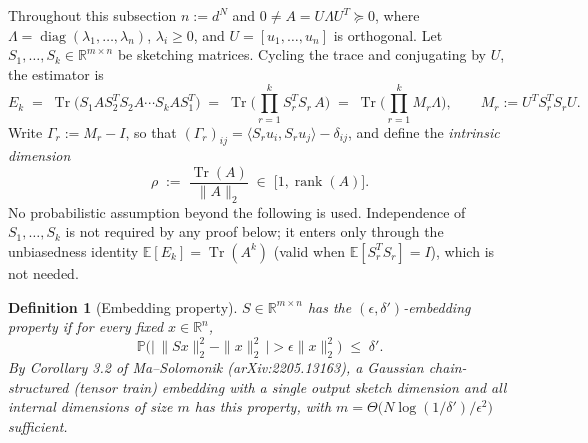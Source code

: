 \documentclass{article}
\newtheorem{definition}[theorem]{Definition}
\theoremstyle{remark}
\begin{document}
Throughout this subsection $n := d^N$ and $0 \neq A = U \Lambda U^T \succeq 0$, where $\Lambda = \operatorname{diag}(\lambda_1,\dots,\lambda_n)$, $\lambda_i \ge 0$, and $U = [u_1,\dots,u_n]$ is orthogonal. Let $S_1,\dots,S_k \in \mathbb{R}^{m \times n}$ be sketching matrices. Cycling the trace and conjugating by $U$, the estimator is
\begin{equation}\label{eq:Ek-def}
E_k \;=\; \operatorname{Tr}\!\big(S_1 A S_2^T S_2 A \cdots S_k A S_1^T\big)
\;=\; \operatorname{Tr}\!\Big(\prod_{r=1}^{k} S_r^T S_r\, A\Big)
\;=\; \operatorname{Tr}\!\Big(\prod_{r=1}^{k} M_r \Lambda\Big),
\qquad M_r := U^T S_r^T S_r U .
\end{equation}
Write $\Gamma_r := M_r - I$, so that $(\Gamma_r)_{ij} = \langle S_r u_i, S_r u_j\rangle - \delta_{ij}$, and define the \emph{intrinsic dimension}
\begin{equation}\label{eq:rho-def}
\rho \;:=\; \frac{\operatorname{Tr}(A)}{\|A\|_2} \;\in\; \big[1,\operatorname{rank}(A)\big].
\end{equation}
No probabilistic assumption beyond the following is used. Independence of $S_1,\dots,S_k$ is not required by any proof below; it enters only through the unbiasedness identity $\mathbb{E}[E_k] = \operatorname{Tr}(A^k)$ (valid when $\mathbb{E}[S_r^T S_r] = I$), which is not needed.

\begin{definition}[Embedding property]\label{def:jl}
$S \in \mathbb{R}^{m\times n}$ has the \emph{$(\epsilon,\delta')$-embedding property} if for every fixed $x \in \mathbb{R}^n$,
\begin{equation}
\mathbb{P}\Big( \big|\, \|Sx\|_2^2 - \|x\|_2^2 \,\big| > \epsilon \|x\|_2^2 \Big) \;\le\; \delta'.
\end{equation}
By Corollary 3.2 of Ma--Solomonik (arXiv:2205.13163), a Gaussian chain-structured (tensor train) embedding with a single output sketch dimension and all internal dimensions of size $m$ has this property, with $m = \Theta\big( N \log(1/\delta')/\epsilon^2 \big)$ sufficient.
\end{definition}
\end{document}
